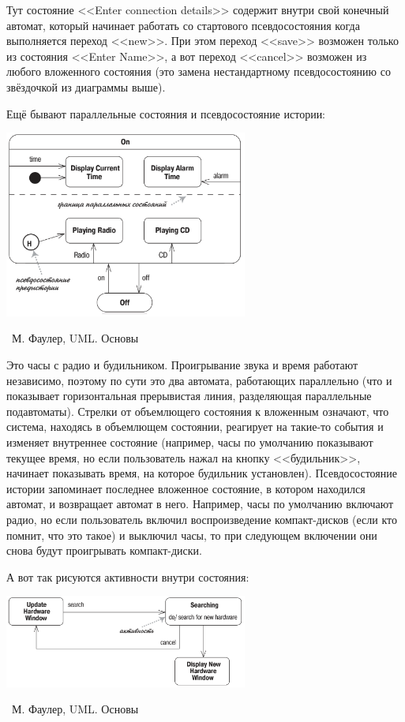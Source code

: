 \documentclass[a5paper]{article}
\newcommand{\attribution}[1] {
	\vspace{-5mm}\begin{flushright}\begin{scriptsize}%
	{\textcopyright\, #1}\end{scriptsize}\end{flushright}
}
\begin{document}
Тут состояние <<Enter connection details>> содержит внутри свой конечный автомат, который начинает работать со стартового псевдосостояния когда выполняется переход <<new>>. При этом переход <<save>> возможен только из состояния <<Enter Name>>, а вот переход <<cancel>> возможен из любого вложенного состояния (это замена нестандартному псевдосостоянию со звёздочкой из диаграммы выше).

Ещё бывают параллельные состояния и псевдосостояние истории:

\begin{center}
	\includegraphics[width=0.6\textwidth]{stateTransitionParallelStates.png}
	\attribution{М. Фаулер, UML. Основы}
\end{center}

Это часы с радио и будильником. Проигрывание звука и время работают независимо, поэтому по сути это два автомата, работающих параллельно (что и показывает горизонтальная прерывистая линия, разделяющая параллельные подавтоматы). Стрелки от объемлющего состояния к вложенным означают, что система, находясь в объемлющем состоянии, реагирует на такие-то события и изменяет внутреннее состояние (например, часы по умолчанию показывают текущее время, но если пользователь нажал на кнопку <<будильник>>, начинает показывать время, на которое будильник установлен). Псевдосостояние истории запоминает последнее вложенное состояние, в котором находился автомат, и возвращает автомат в него. Например, часы по умолчанию включают радио, но если пользователь включил воспроизведение компакт-дисков (если кто помнит, что это такое) и выключил часы, то при следующем включении они снова будут проигрывать компакт-диски.

А вот так рисуются активности внутри состояния:

\begin{center}
	\includegraphics[width=0.6\textwidth]{stateTransitionInternalEventExample.png}
	\attribution{М. Фаулер, UML. Основы}
\end{center}
\end{document}
